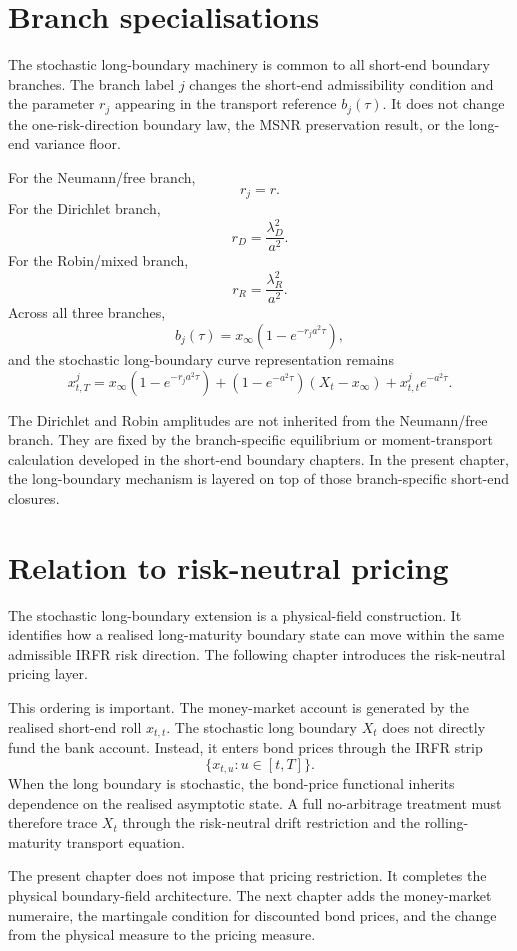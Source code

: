 \documentclass[11pt,oneside]{book}
\begin{document}
\section{Branch specialisations}

The stochastic long-boundary machinery is common to all short-end boundary branches. The branch label \(j\) changes the short-end admissibility condition and the parameter \(r_j\) appearing in the transport reference \(b_j(\tau)\). It does not change the one-risk-direction boundary law, the MSNR preservation result, or the long-end variance floor.

For the Neumann/free branch,
\[
r_j=r.
\]
For the Dirichlet branch,
\[
r_D=\frac{\lambda_D^2}{a^2}.
\]
For the Robin/mixed branch,
\[
r_R=\frac{\lambda_R^2}{a^2}.
\]
Across all three branches,
\[
b_j(\tau)
=
x_\infty\left(1-e^{-r_j a^2\tau}\right),
\]
and the stochastic long-boundary curve representation remains
\[
x^j_{t,T}
=
x_\infty\left(1-e^{-r_j a^2\tau}\right)
+
\left(1-e^{-a^2\tau}\right)(X_t-x_\infty)
+
x^j_{t,t}e^{-a^2\tau}.
\]

The Dirichlet and Robin amplitudes are not inherited from the Neumann/free branch. They are fixed by the branch-specific equilibrium or moment-transport calculation developed in the short-end boundary chapters. In the present chapter, the long-boundary mechanism is layered on top of those branch-specific short-end closures.

\section{Relation to risk-neutral pricing}

The stochastic long-boundary extension is a physical-field construction. It identifies how a realised long-maturity boundary state can move within the same admissible IRFR risk direction. The following chapter introduces the risk-neutral pricing layer.

This ordering is important. The money-market account is generated by the realised short-end roll \(x_{t,t}\). The stochastic long boundary \(X_t\) does not directly fund the bank account. Instead, it enters bond prices through the IRFR strip
\[
\{x_{t,u}:u\in[t,T]\}.
\]
When the long boundary is stochastic, the bond-price functional inherits dependence on the realised asymptotic state. A full no-arbitrage treatment must therefore trace \(X_t\) through the risk-neutral drift restriction and the rolling-maturity transport equation.

The present chapter does not impose that pricing restriction. It completes the physical boundary-field architecture. The next chapter adds the money-market numeraire, the martingale condition for discounted bond prices, and the change from the physical measure to the pricing measure.
\end{document}
